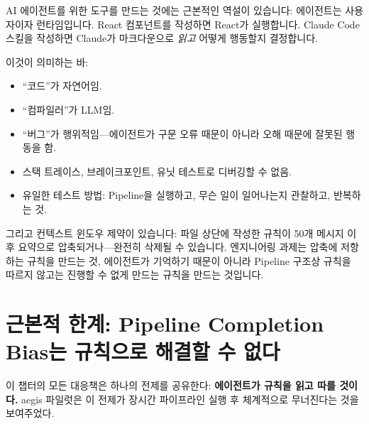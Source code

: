 \documentclass[11pt,a4paper,openright,twoside]{report}
\begin{document}
AI 에이전트를 위한 도구를 만드는 것에는 근본적인 역설이 있습니다: 에이전트는 사용자이자 런타임입니다. React 컴포넌트를 작성하면 React가 실행합니다. Claude Code 스킬을 작성하면 Claude가 마크다운으로 \emph{읽고} 어떻게 행동할지 결정합니다.

이것이 의미하는 바:
\begin{itemize}
  \item ``코드''가 자연어임.
  \item ``컴파일러''가 LLM임.
  \item ``버그''가 행위적임---에이전트가 구문 오류 때문이 아니라 오해 때문에 잘못된 행동을 함.
  \item 스택 트레이스, 브레이크포인트, 유닛 테스트로 디버깅할 수 없음.
  \item 유일한 테스트 방법: Pipeline을 실행하고, 무슨 일이 일어나는지 관찰하고, 반복하는 것.
\end{itemize}

그리고 컨텍스트 윈도우 제약이 있습니다: 파일 상단에 작성한 규칙이 50개 메시지 이후 요약으로 압축되거나---완전히 삭제될 수 있습니다. 엔지니어링 과제는 압축에 저항하는 규칙을 만드는 것, 에이전트가 기억하기 때문이 아니라 Pipeline 구조상 규칙을 따르지 않고는 진행할 수 없게 만드는 규칙을 만드는 것입니다.

\section{근본적 한계: Pipeline Completion Bias는 규칙으로 해결할 수 없다}

이 챕터의 모든 대응책은 하나의 전제를 공유한다: \textbf{에이전트가 규칙을 읽고 따를 것이다.} aegis 파일럿은 이 전제가 장시간 파이프라인 실행 후 체계적으로 무너진다는 것을 보여주었다.
\end{document}
